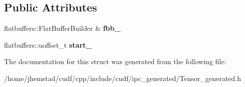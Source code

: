 \subsection*{Public Attributes}
\begin{DoxyCompactItemize}
\item 
flatbuffers\+::\+Flat\+Buffer\+Builder \& {\bfseries fbb\+\_\+}\hypertarget{structorg_1_1apache_1_1arrow_1_1flatbuf_1_1TensorDimBuilder_a9991607b30a4cbdf4010cb58b377a1e1}{}\label{structorg_1_1apache_1_1arrow_1_1flatbuf_1_1TensorDimBuilder_a9991607b30a4cbdf4010cb58b377a1e1}

\item 
flatbuffers\+::uoffset\+\_\+t {\bfseries start\+\_\+}\hypertarget{structorg_1_1apache_1_1arrow_1_1flatbuf_1_1TensorDimBuilder_a85986dc74762c4bcac5a1e3342bcb961}{}\label{structorg_1_1apache_1_1arrow_1_1flatbuf_1_1TensorDimBuilder_a85986dc74762c4bcac5a1e3342bcb961}

\end{DoxyCompactItemize}


The documentation for this struct was generated from the following file\+:\begin{DoxyCompactItemize}
\item 
/home/jhemstad/cudf/cpp/include/cudf/ipc\+\_\+generated/Tensor\+\_\+generated.\+h\end{DoxyCompactItemize}
